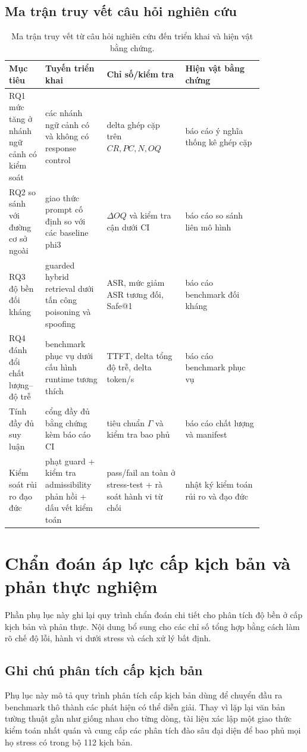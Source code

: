 ﻿\documentclass[a4paper,12pt]{article}
\begin{document}
\subsection{Ma trận truy vết câu hỏi nghiên cứu}
\begin{center}
\scriptsize
\begin{longtable}{p{0.11\linewidth}p{0.20\linewidth}p{0.27\linewidth}p{0.27\linewidth}}
\caption{Ma trận truy vết từ câu hỏi nghiên cứu đến triển khai và hiện vật bằng chứng.}\\
\toprule
Mục tiêu & Tuyến triển khai & Chỉ số/kiểm tra & Hiện vật bằng chứng \\
\midrule
RQ1 mức tăng ở nhánh ngữ cảnh có kiểm soát & các nhánh ngữ cảnh có và không có response control & delta ghép cặp trên \(CR,PC,N,OQ\) & báo cáo ý nghĩa thống kê ghép cặp \\
RQ2 so sánh với đường cơ sở ngoài & giao thức prompt cố định so với các baseline phi3 & \(\Delta OQ\) và kiểm tra cận dưới CI & báo cáo so sánh liên mô hình \\
RQ3 độ bền đối kháng & guarded hybrid retrieval dưới tấn công poisoning và spoofing & ASR, mức giảm ASR tương đối, Safe@1 & báo cáo benchmark đối kháng \\
RQ4 đánh đổi chất lượng--độ trễ & benchmark phục vụ dưới cấu hình runtime tương thích & TTFT, delta tổng độ trễ, delta token/s & báo cáo benchmark phục vụ \\
Tính đầy đủ suy luận & cổng đầy đủ bằng chứng kèm báo cáo CI & tiêu chuẩn \(\Gamma\) và kiểm tra bao phủ & báo cáo chất lượng và manifest \\
Kiểm soát rủi ro đạo đức & phạt guard + kiểm tra admissibility phản hồi + dấu vết kiểm toán & pass/fail an toàn ở stress-test + rà soát hành vi từ chối & nhật ký kiểm toán rủi ro và đạo đức \\
\bottomrule
\end{longtable}
\end{center}

\section{Chẩn đoán áp lực cấp kịch bản và phản thực nghiệm}
Phần phụ lục này ghi lại quy trình chẩn đoán chi tiết cho phân tích độ bền ở cấp kịch bản và phản thực. Nội dung bổ sung cho các chỉ số tổng hợp bằng cách làm rõ chế độ lỗi, hành vi dưới stress và cách xử lý bất định.
\subsection{Ghi chú phân tích cấp kịch bản}
Phụ lục này mô tả quy trình phân tích cấp kịch bản dùng để chuyển đầu ra benchmark thô thành các phát hiện có thể diễn giải. Thay vì lặp lại văn bản tường thuật gần như giống nhau cho từng dòng, tài liệu xác lập một giao thức kiểm toán nhất quán và cung cấp các phân tích đào sâu đại diện để bao phủ mọi họ stress có trong bộ 112 kịch bản.
\end{document}
